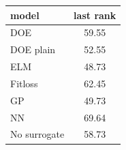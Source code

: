 \begin{tabular}{|lc|}
\hline
model & last rank\\
\hline
DOE & 59.55 \\
DOE plain & 52.55 \\
ELM & 48.73 \\
Fitloss & 62.45 \\
GP & 49.73 \\
NN & 69.64 \\
No surrogate & 58.73 \\
\hline
\end{tabular}
